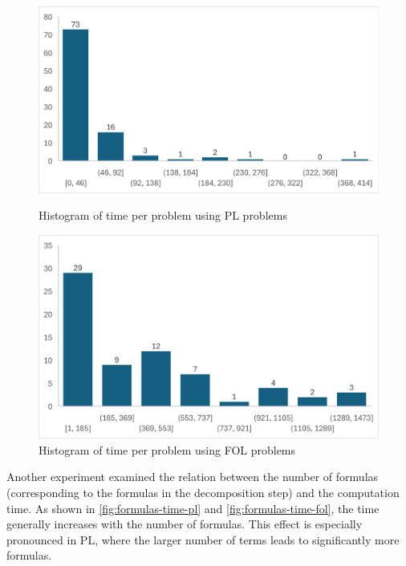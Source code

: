 \begin{figure}[h]
    \centering
    \begin{minipage}{0.49\textwidth}
        \centering
        \includegraphics[width=\linewidth]{Chapters/Figures/time_formulas_histogram_pl.png}
        \caption{Histogram of time per problem using PL problems}
        \label{fig:histogram-time-formulas-pl}
    \end{minipage}
    \hfill
    \begin{minipage}{0.49\textwidth}
        \centering
        \includegraphics[width=\linewidth]{Chapters/Figures/time_formulas_histogram_fol.png}
        \caption{Histogram of time per problem using FOL problems}
        \label{fig:histogram-time-formulas-fol}
    \end{minipage}
\end{figure}

Another experiment examined the relation between the number of formulas (corresponding to the formulas in the decomposition step) and the computation time. As shown in \autoref{fig:formulas-time-pl} and \autoref{fig:formulas-time-fol}, the time generally increases with the number of formulas. This effect is especially pronounced in \gls{PL}, where the larger number of terms leads to significantly more formulas.

